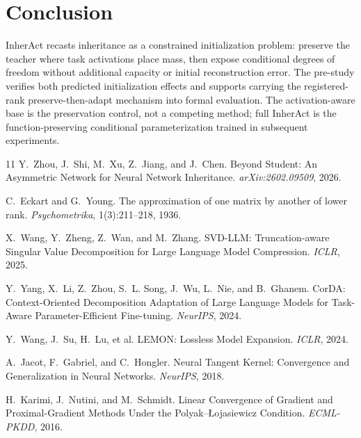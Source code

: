 \documentclass{article}
\begin{document}
\section{Conclusion}

InherAct recasts inheritance as a constrained initialization problem: preserve
the teacher where task activations place mass, then expose conditional degrees
of freedom without additional capacity or initial reconstruction error.  The
pre-study verifies both predicted initialization effects and supports carrying
the registered-rank preserve-then-adapt mechanism into formal
evaluation.
The activation-aware base is the preservation control, not a competing method;
full InherAct is the function-preserving conditional parameterization trained in
subsequent experiments.

\begin{thebibliography}{11}
Y.~Zhou, J.~Shi, M.~Xu, Z.~Jiang, and J.~Chen.
\newblock Beyond Student: An Asymmetric Network for Neural Network Inheritance.
\newblock \emph{arXiv:2602.09509}, 2026.

C.~Eckart and G.~Young.
\newblock The approximation of one matrix by another of lower rank.
\newblock \emph{Psychometrika}, 1(3):211--218, 1936.

X.~Wang, Y.~Zheng, Z.~Wan, and M.~Zhang.
\newblock SVD-LLM: Truncation-aware Singular Value Decomposition for Large
Language Model Compression.
\newblock \emph{ICLR}, 2025.

Y.~Yang, X.~Li, Z.~Zhou, S.~L. Song, J.~Wu, L.~Nie, and B.~Ghanem.
\newblock CorDA: Context-Oriented Decomposition Adaptation of Large Language
Models for Task-Aware Parameter-Efficient Fine-tuning.
\newblock \emph{NeurIPS}, 2024.

Y.~Wang, J.~Su, H.~Lu, et al.
\newblock LEMON: Lossless Model Expansion.
\newblock \emph{ICLR}, 2024.

A.~Jacot, F.~Gabriel, and C.~Hongler.
\newblock Neural Tangent Kernel: Convergence and Generalization in Neural
Networks.
\newblock \emph{NeurIPS}, 2018.

H.~Karimi, J.~Nutini, and M.~Schmidt.
\newblock Linear Convergence of Gradient and Proximal-Gradient Methods Under
the Polyak--\L{}ojasiewicz Condition.
\newblock \emph{ECML-PKDD}, 2016.
\end{thebibliography}
\end{document}
